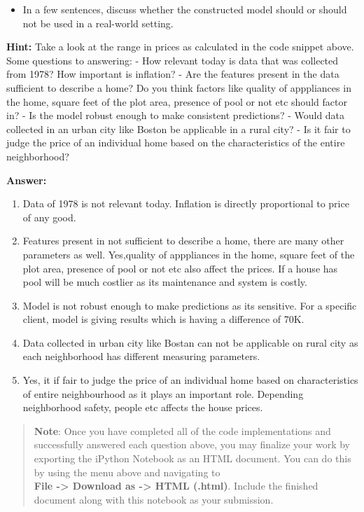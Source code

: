 \documentclass[11pt]{article}
\providecommand{\tightlist}{%
      \setlength{\itemsep}{0pt}\setlength{\parskip}{0pt}}
\begin{document}
\begin{itemize}
\tightlist
\item
  In a few sentences, discuss whether the constructed model should or
  should not be used in a real-world setting.
\end{itemize}

\textbf{Hint:} Take a look at the range in prices as calculated in the
code snippet above. Some questions to answering: - How relevant today is
data that was collected from 1978? How important is inflation? - Are the
features present in the data sufficient to describe a home? Do you think
factors like quality of apppliances in the home, square feet of the plot
area, presence of pool or not etc should factor in? - Is the model
robust enough to make consistent predictions? - Would data collected in
an urban city like Boston be applicable in a rural city? - Is it fair to
judge the price of an individual home based on the characteristics of
the entire neighborhood?

    \textbf{Answer: }

\begin{enumerate}
\def\labelenumi{\arabic{enumi}.}
\tightlist
\item
  Data of 1978 is not relevant today. Inflation is directly proportional
  to price of any good.
\item
  Features present in not sufficient to describe a home, there are many
  other parameters as well. Yes,quality of apppliances in the home,
  square feet of the plot area, presence of pool or not etc also affect
  the prices. If a house has pool will be much costlier as its
  maintenance and system is costly.
\item
  Model is not robust enough to make predictions as its sensitive. For a
  specific client, model is giving results which is having a difference
  of 70K.
\item
  Data collected in urban city like Bostan can not be applicable on
  rural city as each neighborhood has different measuring parameters.
\item
  Yes, it if fair to judge the price of an individual home based on
  characteristics of entire neighbourhood as it plays an important role.
  Depending neighborhood safety, people etc affects the house prices.
\end{enumerate}

    \begin{quote}
\textbf{Note}: Once you have completed all of the code implementations
and successfully answered each question above, you may finalize your
work by exporting the iPython Notebook as an HTML document. You can do
this by using the menu above and navigating to\\
\textbf{File -\textgreater{} Download as -\textgreater{} HTML (.html)}.
Include the finished document along with this notebook as your
submission.
\end{quote}


    
    
    
    
\end{document}
